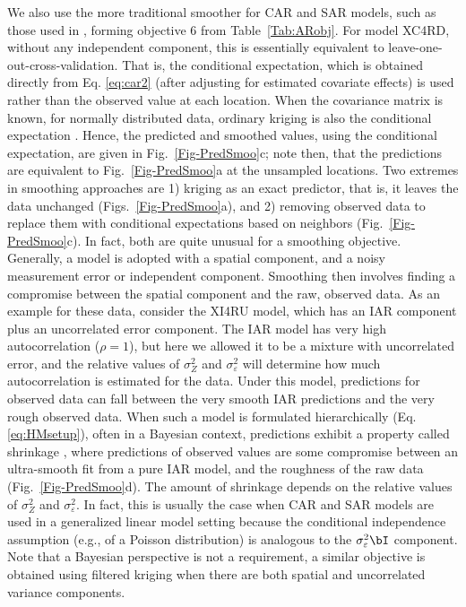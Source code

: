 We also use the more traditional smoother for CAR and SAR models, such as those used in \citep{Clay:Kald:empi:1987}, forming objective 6 from Table~\ref{Tab:ARobj}.  For model XC4RD, without any independent component, this is essentially equivalent to leave-one-out-cross-validation. That is, the conditional expectation, which is obtained directly from Eq. \ref{eq:car2} (after adjusting for estimated covariate effects) is used rather than the observed value at each location. When the covariance matrix is known, for normally distributed data, ordinary kriging is also the conditional expectation \citep[p. 108, 174]{Cres:stat:1993}.  Hence, the predicted and smoothed values, using the conditional expectation, are given in Fig.~\ref{Fig-PredSmoo}c; note then, that the predictions are equivalent to Fig.~\ref{Fig-PredSmoo}a at the unsampled locations. Two extremes in smoothing approaches are 1) kriging as an exact predictor, that is, it leaves the data unchanged (Figs.~\ref{Fig-PredSmoo}a), and 2) removing observed data to replace them with conditional expectations based on neighbors (Fig.~\ref{Fig-PredSmoo}c).  In fact, both are quite unusual for a smoothing objective. Generally, a model is adopted with a spatial component, and a noisy measurement error or independent component.  Smoothing then involves finding a compromise between the spatial component and the raw, observed data. As an example for these data, consider the XI4RU model, which has an IAR component plus an uncorrelated error component.  The IAR model has very high autocorrelation ($\rho = 1$), but here we allowed it to be a mixture with uncorrelated error, and the relative values of $\sigma_Z^2$ and $\sigma^2_\varepsilon$ will determine how much autocorrelation is estimated for the data.  Under this model, predictions for observed data can fall between the very smooth IAR predictions and the very rough observed data. When such a model is formulated hierarchically (Eq. \ref{eq:HMsetup}), often in a Bayesian context, predictions exhibit a property called shrinkage \citep{Fay:Herr:esti:1979}, where predictions of observed values are some compromise between an ultra-smooth fit from a pure IAR model, and the roughness of the raw data (Fig.~\ref{Fig-PredSmoo}d).  The amount of shrinkage depends on the relative values of $\sigma_Z^2$ and $\sigma^2_\varepsilon$.  In fact, this is usually the case when CAR and SAR models are used in a generalized linear model setting because the conditional independence assumption (e.g., of a Poisson distribution) is analogous to the $\sigma^2_\varepsilon\bI$ component.  Note that a Bayesian perspective is not a requirement, a similar objective is obtained using filtered kriging \citep[][pg. 306]{Wall:Gotw:appl:2004} when there are both spatial and uncorrelated variance components.

